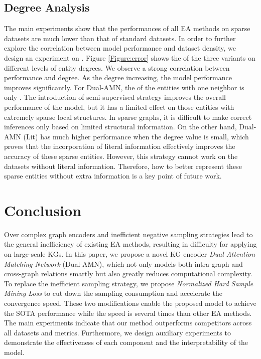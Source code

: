 \documentclass[sigconf]{acmart}
\begin{document}
\subsection{Degree Analysis}
The main experiments show that the performances of all EA methods on sparse datasets are much lower than that of standard datasets.
In order to further explore the correlation between model performance and dataset density, we design an experiment on .
Figure \ref{Figure:error} shows the  of the three variants on different levels of entity degrees.
We observe a strong correlation between performance and degree.
As the degree increasing, the model performance improves significantly.
For Dual-AMN, the  of the entities with one neighbor is only .
The introduction of semi-supervised strategy improves the overall performance of the model, but it has a limited effect on those entities with extremely sparse local structures.
In sparse graphs, it is difficult to make correct inferences only based on limited structural information.
On the other hand, Dual-AMN (Lit) has much higher performance when the degree value is small, which proves that the incorporation of literal information effectively improves the accuracy of these sparse entities.
However, this strategy cannot work on the datasets without literal information.
Therefore, how to better represent these sparse entities without extra information is a key point of future work.

\section{Conclusion}
Over complex graph encoders and inefficient negative sampling strategies lead to the general inefficiency of existing EA methods, resulting in difficulty for applying on large-scale KGs.
In this paper, we propose a novel KG encoder \emph{Dual Attention Matching Network} (Dual-AMN), which not only models both intra-graph and cross-graph relations smartly but also greatly reduces computational complexity.
To replace the inefficient sampling strategy, we propose \emph{Normalized Hard Sample Mining Loss} to cut down the sampling consumption and accelerate the convergence speed.
These two modifications enable the proposed model to achieve the SOTA performance while the speed is several times than other EA methods.
The main experiments indicate that our method outperforms competitors across all datasets and metrics.
Furthermore, we design auxiliary experiments to demonstrate the effectiveness of each component and the interpretability of the model.



\end{document}

